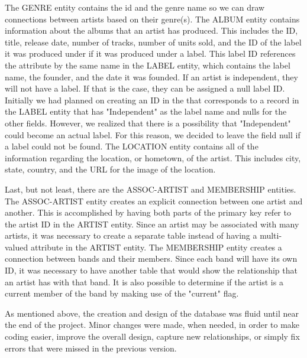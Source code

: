 \documentclass{sig-alternate}
\begin{document}
The GENRE entity contains the id and the genre name so we can draw connections between artists based on their 
genre(s). The ALBUM entity contains information about the albums that an artist has produced. This includes the 
ID, title, release date, number of tracks, number of units sold, and the ID of the label it was produced under 
if it was produced under a label. This label ID references the attribute by the same name in the LABEL entity, 
which contains the label name, the founder, and the date it was founded. If an artist is independent, they will 
not have a label. If that is the case, they can be assigned a null label ID. Initially we had planned on creating 
an ID in the  that corresponds to a record in the LABEL entity that has "Independent" as the label name and nulls 
for the other fields. However, we realized that there is a possibility that "Independent" could become an actual label.
For this reason, we decided to leave the field null if a label could not be found. The LOCATION entity contains all of 
the information regarding the location, or hometown, of the artist. This includes city, state, country, and the URL for the image of the location.

Last, but not least, there are the ASSOC-ARTIST and MEMBERSHIP entities. The ASSOC-ARTIST entity creates an explicit connection between one artist 
and another. This is accomplished by having both parts of the primary key refer to the artist ID in the ARTIST 
entity. Since an artist may be associated with many artists, it was necessary to create a separate table instead 
of having a multi-valued attribute in the ARTIST entity. The MEMBERSHIP entity creates a connection between bands and their members. Since each band will have its own ID, it was necessary to have another table that would show the relationship that an artist has with that band. It is also possible to determine if the artist is a current member of the band by making use of the "current" flag.

As mentioned above, the creation and design of the database was fluid until near the end of the project. 
Minor changes were made, when needed, in order to make coding easier, improve the overall design, capture 
new relationships, or simply fix errors that were missed in the previous version.
\end{document}

